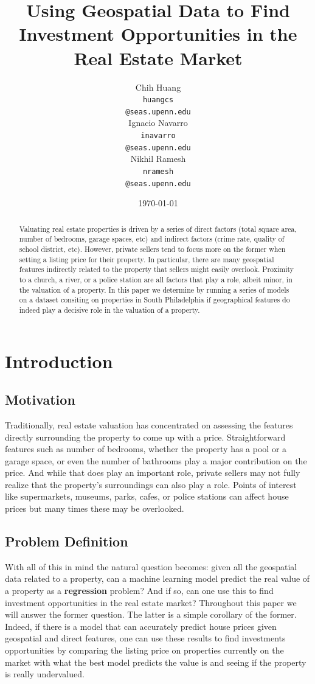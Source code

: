\documentclass[11pt,a4paper]{article}
\title{Using Geospatial Data to Find Investment Opportunities in the Real Estate Market}
\author{Chih Huang \\
  {\tt huangcs} \\
  {\tt @seas.upenn.edu} \\\And
  Ignacio Navarro \\
  {\tt inavarro} \\
  {\tt @seas.upenn.edu} \\\And
  Nikhil Ramesh \\
  {\tt nramesh} \\
  {\tt @seas.upenn.edu}
}
\date{\today}
\begin{document}
\maketitle
\begin{abstract}
  Valuating real estate properties is driven by a series of direct 
  factors (total square area, number of bedrooms, garage spaces, etc) 
  and indirect factors (crime rate, quality of school district, etc). However, private sellers tend to focus more on the former when setting 
  a listing price for their property. In particular, there are many
  geospatial features indirectly related to the property that sellers
  might easily overlook. Proximity to a church, a river, or a police
  station are all factors that play a role, albeit minor, in the valuation
  of a property. In this paper we determine by running a series of models on a dataset consiting
  on properties in South Philadelphia if geographical features do indeed play a decisive role 
  in the valuation of a property. 
\end{abstract}

\section{Introduction}

\subsection{Motivation}

Traditionally, real estate valuation has concentrated on assessing the
features directly surrounding the property to come up with a price.
Straightforward features such as number of bedrooms, whether the property
has a pool or a garage space, or even the number of bathrooms play a major
contribution on the price. And while that does play an important role, private
sellers may not fully realize that the property's surroundings can also
play a role. Points of interest like supermarkets, museums, parks, cafes,
or police stations can affect house prices but many times these may be
overlooked. 

\subsection{Problem Definition}

With all of this in mind the natural question becomes: given all the 
geospatial data related to a property, can a machine learning model 
predict the real value of a property as a \textbf{regression} problem? 
And if so, can one use this to
find investment opportunities in the real estate market? Throughout
this paper we will answer the former question. The latter is a simple
corollary of the former. Indeed, if there is a model that can accurately 
predict house prices given geospatial and direct features, one can use these
results to find investments opportunities by comparing the listing
price on properties currently on the market with what the best model 
predicts the value is and seeing if the property is really undervalued.
\end{document}
